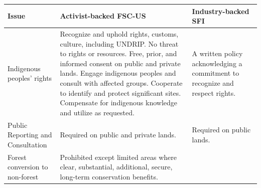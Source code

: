 \documentclass[
      12pt,
        ]{article}
\begin{document}
\begin{longtable}[]{@{}lll@{}}
\toprule
\begin{minipage}[b]{0.20\columnwidth}\raggedright\strut
Issue\strut
\end{minipage} & \begin{minipage}[b]{0.36\columnwidth}\raggedright\strut
Activist-backed FSC-US\strut
\end{minipage} & \begin{minipage}[b]{0.36\columnwidth}\raggedright\strut
Industry-backed SFI\strut
\end{minipage}\tabularnewline
\midrule
\endhead
\begin{minipage}[t]{0.20\columnwidth}\raggedright\strut
Indigenous peoples' rights\strut
\end{minipage} & \begin{minipage}[t]{0.36\columnwidth}\raggedright\strut
Recognize and uphold rights, customs, culture, including UNDRIP. No
threat to rights or resources. Free, prior, and informed consent on
public and private lands. Engage indigenous peoples and consult with
affected groups. Cooperate to identify and protect significant sites.
Compensate for indigenous knowledge and utilize as requested.\strut
\end{minipage} & \begin{minipage}[t]{0.36\columnwidth}\raggedright\strut
A written policy acknowledging a commitment to recognize and respect
rights.\strut
\end{minipage}\tabularnewline
\begin{minipage}[t]{0.20\columnwidth}\raggedright\strut
Public Reporting and Consultation\strut
\end{minipage} & \begin{minipage}[t]{0.36\columnwidth}\raggedright\strut
Required on public and private lands.\strut
\end{minipage} & \begin{minipage}[t]{0.36\columnwidth}\raggedright\strut
Required on public lands.\strut
\end{minipage}\tabularnewline
\begin{minipage}[t]{0.20\columnwidth}\raggedright\strut
Forest conversion to non-forest\strut
\end{minipage} & \begin{minipage}[t]{0.36\columnwidth}\raggedright\strut
Prohibited except limited areas where clear, substantial, additional,
secure, long-term conservation benefits.\strut
\end{minipage} & \begin{minipage}[t]{0.36\columnwidth}\raggedright\strut

\end{minipage}
\end{longtable}
\end{document}
